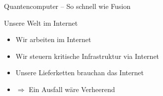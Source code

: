 \begin{frame}[T]{Quantencomputer – So schnell wie Fusion}
  
%

\end{frame}


\begin{frame}[T]{Unsere Welt im Internet}
\begin{itemize}
  \item Wir arbeiten im Internet
  \item Wir steuern kritische Infrastruktur via Internet
  \item Unsere Lieferketten brauchan das Internet
  \item $\Rightarrow$ Ein Ausfall wäre Verheerend
\end{itemize}
\end{frame}



